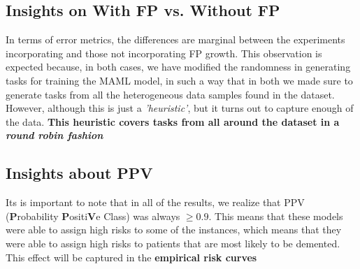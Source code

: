 \documentclass{article}
\begin{document}
%
%
%

\subsection{Insights on With FP vs. Without FP}
In terms of error metrics, the differences are marginal between the experiments incorporating and those not incorporating FP growth. This observation is expected because, in both cases, we have modified the randomness in generating tasks for training the MAML model, in such a way that in both we made sure to generate tasks from all the heterogeneous data samples found in the dataset. However, although this is just a \textit{'heuristic'}, but it turns out to capture enough of the data.  \textbf{This heuristic covers tasks from all around the dataset in a \textit{round robin fashion}}

\subsection{Insights about PPV}
Its is important to note that in all of the results, we realize that PPV (\textbf{P}robability \textbf{P}ositi\textbf{V}e Class) was always $\geq 0.9$. This means that these models were able to assign high risks to some of the instances, which means that they were able to assign high risks to patients that are most likely to be demented. This effect will be captured in the \textbf{empirical risk curves}
\end{document}
